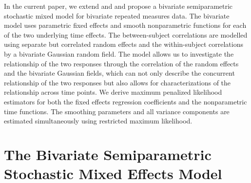 \documentclass[article,lineno]{biometrika}
\begin{document}
In the current paper, we extend \citet {Zhang:1998} and \citet{Zhan:Lin:Sowe:quan:2000} and propose a bivariate semiparametric stochastic mixed model for bivariate repeated measures data.  The bivariate model uses parametric fixed effects and smooth nonparametric functions for each of the two underlying time effects. 
The between-subject correlations are modelled using separate but correlated random effects and the within-subject correlations by a bivariate Gaussian random field. 
The model allows us to investigate the relationship of the two responses through the correlation of the random effects and the bivariate Gaussian fields, which can not only describe the concurrent relationship of the two responses but also allows for characterizations of the relationship across time points.
We derive maximum penalized likelihood estimators for both the fixed effects regression coefficients and the nonparametric time functions. The smoothing parameters and all variance components are estimated simultaneously using restricted maximum likelihood.  

%
%
%
\section{The Bivariate Semiparametric Stochastic Mixed Effects Model} \label{modelSpe}


\end{document}
